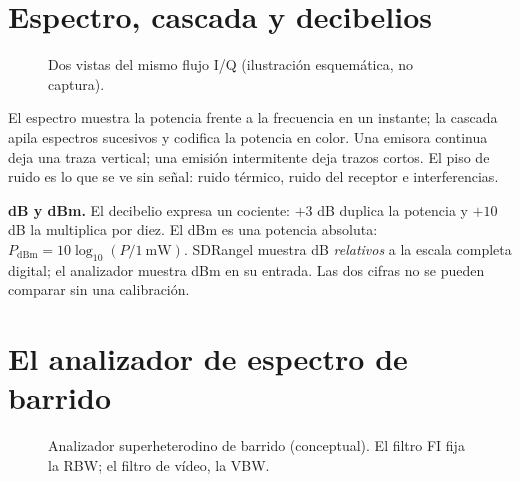 \section{Espectro, cascada y decibelios}
\label{sec:a-espectro}

\begin{figure}[H]
\centering

\caption{Dos vistas del mismo flujo I/Q (ilustración esquemática, no captura).}
\label{fig:a-waterfall}
\end{figure}

El espectro muestra la potencia frente a la frecuencia en un instante; la cascada apila espectros sucesivos y codifica la potencia en color. Una emisora continua deja una traza vertical; una emisión intermitente deja trazos cortos. El piso de ruido es lo que se ve sin señal: ruido térmico, ruido del receptor e interferencias.

\textbf{dB y dBm.} El decibelio expresa un cociente: $+3$ dB duplica la potencia y $+10$ dB la multiplica por diez. El dBm es una potencia absoluta: $P_{\mathrm{dBm}} = 10\log_{10}(P/1~\mathrm{mW})$. SDRangel muestra dB \emph{relativos} a la escala completa digital; el analizador muestra dBm en su entrada. Las dos cifras no se pueden comparar sin una calibración.

\section{El analizador de espectro de barrido}
\label{sec:a-analizador}

\begin{figure}[H]
\centering
\resizebox{\linewidth}{!}{}
\caption{Analizador superheterodino de barrido (conceptual). El filtro FI fija la RBW; el filtro de vídeo, la VBW.}
\label{fig:a-analizador}
\end{figure}

